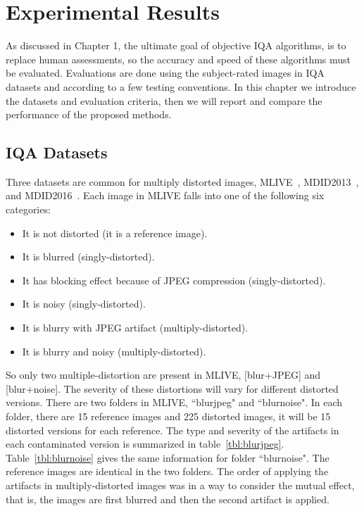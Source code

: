 \chapter{Experimental Results}
As discussed in Chapter 1, the ultimate goal of objective IQA algorithms, is to replace human assessments, so the accuracy and speed of these algorithms must be evaluated. Evaluations are done using the subject-rated images in IQA datasets and according to a few testing conventions. In this chapter we introduce the datasets and evaluation criteria, then we will report and compare the performance of the proposed methods.
\section{IQA Datasets}
Three datasets are common for multiply distorted images, MLIVE~\cite{Jayaraman2012}, MDID2013~\cite{Gu2014}, and MDID2016~\cite{Sun2017}. Each image in MLIVE falls into one of the following six categories:
\begin{itemize}
    \item It is not distorted (it is a reference image).
    \item It is blurred (singly-distorted).
    \item It has blocking effect because of JPEG compression (singly-distorted).
    \item It is noisy (singly-distorted).
    \item It is blurry with JPEG artifact (multiply-distorted).
    \item It is blurry and noisy (multiply-distorted).
\end{itemize}
So only two multiple-distortion are present in MLIVE, [blur+JPEG] and [blur+noise]. The severity of these distortions will vary for different distorted versions. There are two folders in MLIVE, ``blurjpeg" and ``blurnoise". In each folder, there are 15 reference images and 225 distorted images, it will be 15 distorted versions for each reference. The type and severity of the artifacts in each contaminated version is summarized in table~\ref{tbl:blurjpeg}. Table~\ref{tbl:blurnoise} gives the same information for folder ``blurnoise". The reference images are identical in the two folders. The order of applying the artifacts in multiply-distorted images was in a way to consider the mutual effect, that is, the images are first blurred and then the second artifact is applied.
